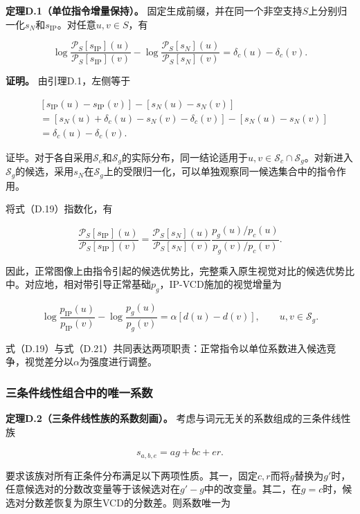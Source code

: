 \textbf{定理D.1（单位指令增量保持）。} 固定生成前缀，并在同一个非空支持\(S\)上分别归一化\(s_N\)和\(s_{\mathrm{IP}}\)。对任意\(u,v\in S\)，有

\[
\boxed{
\log\frac{\mathcal P_S[s_{\mathrm{IP}}](u)}{\mathcal P_S[s_{\mathrm{IP}}](v)}
-
\log\frac{\mathcal P_S[s_N](u)}{\mathcal P_S[s_N](v)}
=\delta_c(u)-\delta_c(v).
}
\tag{D.19}
\]

\textbf{证明。} 由引理D.1，左侧等于

\[
\begin{aligned}
&[s_{\mathrm{IP}}(u)-s_{\mathrm{IP}}(v)]-[s_N(u)-s_N(v)]\\
&=[s_N(u)+\delta_c(u)-s_N(v)-\delta_c(v)]-[s_N(u)-s_N(v)]\\
&=\delta_c(u)-\delta_c(v).
\end{aligned}
\]

证毕。对于各自采用\(\mathcal S_c\)和\(\mathcal S_g\)的实际分布，同一结论适用于\(u,v\in\mathcal S_c\cap\mathcal S_g\)。对新进入\(\mathcal S_g\)的候选，采用\(s_N\)在\(\mathcal S_g\)上的受限归一化，可以单独观察同一候选集合中的指令作用。

将式（D.19）指数化，有

\[
\frac{\mathcal P_S[s_{\mathrm{IP}}](u)}{\mathcal P_S[s_{\mathrm{IP}}](v)}
=
\frac{\mathcal P_S[s_N](u)}{\mathcal P_S[s_N](v)}
\frac{p_g(u)/p_c(u)}{p_g(v)/p_c(v)}.
\tag{D.20}
\]

因此，正常图像上由指令引起的候选优势比，完整乘入原生视觉对比的候选优势比中。对应地，相对带引导正常基础\(p_g\)，IP-VCD施加的视觉增量为

\[
\log\frac{p_{\mathrm{IP}}(u)}{p_{\mathrm{IP}}(v)}
-\log\frac{p_g(u)}{p_g(v)}
=\alpha[d(u)-d(v)],\qquad u,v\in\mathcal S_g.
\tag{D.21}
\]

式（D.19）与式（D.21）共同表达两项职责：正常指令以单位系数进入候选竞争，视觉差分以\(\alpha\)为强度进行调整。

\subsubsection{三条件线性组合中的唯一系数}\label{ux4e09ux6761ux4ef6ux7ebfux6027ux7ec4ux5408ux4e2dux7684ux552fux4e00ux7cfbux6570}

\textbf{定理D.2（三条件线性族的系数刻画）。} 考虑与词元无关的系数组成的三条件线性族

\[
s_{a,b,e}=a g+b c+e r.
\tag{D.22}
\]

要求该族对所有正条件分布满足以下两项性质。其一，固定\(c,r\)而将\(g\)替换为\(g'\)时，任意候选对的分数改变量等于该候选对在\(g'-g\)中的改变量。其二，在\(g=c\)时，候选对分数差恢复为原生VCD的分数差。则系数唯一为

